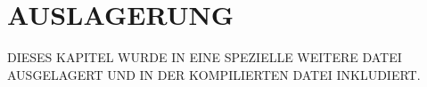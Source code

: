 \section{AUSLAGERUNG}
DIESES KAPITEL WURDE IN EINE SPEZIELLE WEITERE DATEI AUSGELAGERT UND
IN DER KOMPILIERTEN DATEI INKLUDIERT.
